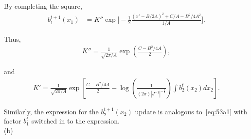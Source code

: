 \documentclass{article}
\begin{document}
By completing the square,
\begin{align*}
	b_1^{t+1}(x_1) &= K''\exp\Big[-\frac{1}{2}
	\frac{(x' - B/2A)^2 + C/A - B^2 / 4A^2}{1/A}\Big].
\end{align*}
%

Thus,
\begin{align}
	K'' = \frac{1}{\sqrt{2\pi/A}}\exp\left(\frac{C-B^2/4A}{2}\right),
\end{align}
%

and
\begin{align}
	K' = \frac{1}{\sqrt{2\pi/A}}\exp\left[\frac{C-B^2/4A}{2} -
	\log\left(\frac{1}{(2\pi)|J^{-1}|^{-\frac{1}{2}}}\right)
	\int b_2^{t}(x_2)dx_2\right].
\end{align}
%

Similarly, the expression for the $b_2^{t+1}(x_2)$ update is analogous
to~\eqref{eq:53a1} with factor $b_1^t$ switched in to the expression. 
\\

\noindent
(b)

\pagebreak

\end{document}
